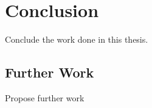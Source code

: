 
\chapter{Conclusion}

Conclude the work done in this thesis.

\section{Further Work}
Propose further work

\cleardoublepage